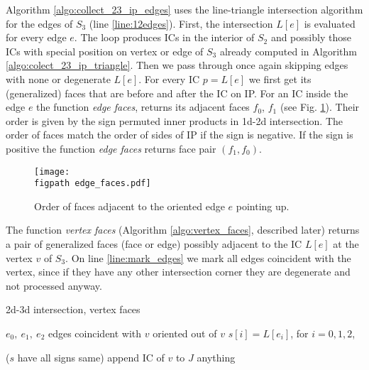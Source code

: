 \documentclass{elsarticle}
\newcommand{\figpath}{figures/}
\begin{document}
Algorithm \ref{algo:collect_23_ip_edges} uses the line-triangle intersection algorithm for the edges of $S_3$ (line \ref{line:12edges}).
First, the intersection $L[e]$ is evaluated for every edge $e$. The loop produces ICs in the interior of $S_2$ and possibly those ICs with special position on vertex or edge of $S_3$ already computed 
in Algorithm \ref{algo:colect_23_ip_triangle}. Then we pass through once again skipping edges with none or degenerate $L[e]$.
For every IC $p=L[e]$ we first get its (generalized) faces that are before and after the IC on IP. For an IC inside the edge $e$
the function \emph{edge faces}, returns its adjacent faces $f_0$, $f_1$ (see Fig. \ref{fig:edge_faces}). 
Their order is given by the sign permuted inner products in 1d-2d intersection. The order of faces match 
the order of sides of IP if the sign is negative. If the sign is positive the function \emph{edge faces} returns face pair $(f_1, f_0)$.
\begin{figure}[!htb]
  \begin{center}        
    \texttt{[image: \\figpath edge\_faces.pdf]}
  \end{center}
  \caption{Order of faces adjacent to the oriented edge $e$ pointing up.}
  \label{fig:edge_faces}
\end{figure}

The function \emph{vertex faces} (Algorithm \ref{algo:vertex_faces}, described later)
returns a pair of generalized faces (face or edge) possibly adjacent to the IC $L[e]$ at the vertex $v$ of $S_3$.
On line \ref{line:mark_edges} we mark all edges coincident with the vertex, since if they have any other intersection corner they are degenerate and 
not processed anyway.

\begin{algorithm}
  \caption{2d-3d intersection, vertex faces}  
  \label{algo:vertex_faces}
  
  \DontPrintSemicolon
  $e_0,\ e_1,\ e_2$ edges coincident with $v$ oriented out of $v$
  $s[i] = L[e_i]$, for $i=0,1,2$, \;
  
  
  
  
  \Else($s$ have all signs same){ 
    append IC of $v$ to $J$
    \return anything\;
  }  
\end{algorithm}
\end{document}
